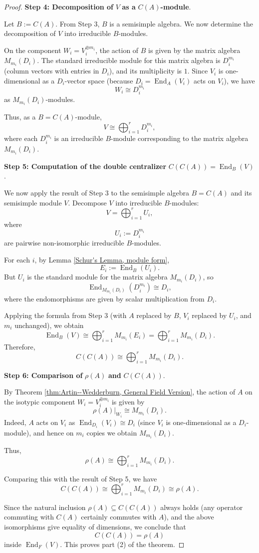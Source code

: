 \begin{proof}
\medskip
\noindent\textbf{Step 4: Decomposition of }$V$ \textbf{as a }$C(A)$\textbf{-module}.

Let $B:=C(A)$. From Step 3, $B$ is a semisimple algebra. We now determine the decomposition of $V$ into irreducible $B$-modules.

On the component $W_i=V_i^{\oplus m_i}$, the action of $B$ is given by the matrix algebra $M_{m_i}(D_i)$. The standard irreducible module for this matrix algebra is $D_i^{m_i}$ (column vectors with entries in $D_i$), and its multiplicity is $1$. Since $V_i$ is one-dimensional as a $D_i$-vector space (because $D_i=\operatorname{End}_A(V_i)$ acts on $V_i$), we have
\[
W_i \cong D_i^{m_i}
\]
as $M_{m_i}(D_i)$-modules.

Thus, as a $B=C(A)$-module,
\[
V \cong \bigoplus_{i=1}^{r} D_i^{m_i},
\]
where each $D_i^{m_i}$ is an irreducible $B$-module corresponding to the matrix algebra $M_{m_i}(D_i)$.

\medskip
\noindent\textbf{Step 5: Computation of the double centralizer }$C(C(A))=\operatorname{End}_{B}(V)$.

We now apply the result of Step 3 to the semisimple algebra $B=C(A)$ and its semisimple module $V$. Decompose $V$ into irreducible $B$-modules:
\[
V = \bigoplus_{i=1}^{r} U_i,
\]
where
\[
U_i := D_i^{m_i}
\]
are pairwise non-isomorphic irreducible $B$-modules.

For each $i$, by Lemma \ref{Schur's Lemma, module form},
\[
E_i:=\operatorname{End}_B(U_i).
\]
But $U_i$ is the standard module for the matrix algebra $M_{m_i}(D_i)$, so
\[
\operatorname{End}_{M_{m_i}(D_i)}(D_i^{m_i}) \cong D_i,
\]
where the endomorphisms are given by scalar multiplication from $D_i$.

Applying the formula from Step 3 (with $A$ replaced by $B$, $V_i$ replaced by $U_i$, and $m_i$ unchanged), we obtain
\[
\operatorname{End}_B(V) \cong \bigoplus_{i=1}^{r} M_{m_i}(E_i)
= \bigoplus_{i=1}^{r} M_{m_i}(D_i).
\]
Therefore,
\[
C(C(A)) \cong \bigoplus_{i=1}^{r} M_{m_i}(D_i).
\]

\medskip
\noindent\textbf{Step 6: Comparison of }$\rho(A)$ \textbf{and }$C(C(A))$.

By Theorem \ref{thm:Artin--Wedderburn, General Field Version}, the action of $A$ on the isotypic component $W_i=V_i^{\oplus m_i}$ is given by
\[
\rho(A)|_{W_i} \cong M_{m_i}(D_i).
\]
Indeed, $A$ acts on $V_i$ as $\operatorname{End}_{D_i}(V_i)\cong D_i$ (since $V_i$ is one-dimensional as a $D_i$-module), and hence on $m_i$ copies we obtain $M_{m_i}(D_i)$.

Thus,
\[
\rho(A) \cong \bigoplus_{i=1}^{r} M_{m_i}(D_i).
\]

Comparing this with the result of Step 5, we have
\[
C(C(A)) \cong \bigoplus_{i=1}^{r} M_{m_i}(D_i) \cong \rho(A).
\]

Since the natural inclusion $\rho(A)\subseteq C(C(A))$ always holds (any operator commuting with $C(A)$ certainly commutes with $A$), and the above isomorphisms give equality of dimensions, we conclude that
\[
C(C(A))=\rho(A)
\]
inside $\operatorname{End}_F(V)$. This proves part (2) of the theorem.
\end{proof}


